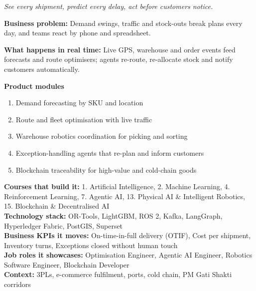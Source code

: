 \documentclass[10pt,a4paper]{article}
\begin{document}
\begin{tcolorbox}[enhanced,breakable,colback=white,colframe=navy,boxrule=0.6pt,arc=2pt,title={\color{goldl}PRODUCT 5 \;|\; LOGISTICS \& SUPPLY CHAIN\\\color{white}\large Autonomous Supply-Chain Control Tower},colbacktitle=navy,fonttitle=\small\bfseries]
{\small\itshape\color{muted}See every shipment, predict every delay, act before customers notice.}\par
\begin{tcolorbox}[colback=l1bg,colframe=l1bg,arc=2pt,borderline west={3pt}{0pt}{saffron},top=2pt,bottom=2pt]\small\textbf{Business problem:} Demand swings, traffic and stock-outs break plans every day, and teams react by phone and spreadsheet.\end{tcolorbox}
\begin{tcolorbox}[colback=l3bg,colframe=l3bg,arc=2pt,borderline west={3pt}{0pt}{igreen},top=2pt,bottom=2pt]\small\textbf{What happens in real time:} Live GPS, warehouse and order events feed forecasts and route optimisers; agents re-route, re-allocate stock and notify customers automatically.\end{tcolorbox}
{\small\textbf{Product modules}}\begin{enumerate}\small
\item Demand forecasting by SKU and location
\item Route and fleet optimisation with live traffic
\item Warehouse robotics coordination for picking and sorting
\item Exception-handling agents that re-plan and inform customers
\item Blockchain traceability for high-value and cold-chain goods
\end{enumerate}
{\small\textbf{Courses that build it:} 1. Artificial Intelligence, 2. Machine Learning, 4. Reinforcement Learning, 7. Agentic AI, 13. Physical AI \& Intelligent Robotics, 15. Blockchain \& Decentralised AI\\\textbf{Technology stack:} OR-Tools, LightGBM, ROS 2, Kafka, LangGraph, Hyperledger Fabric, PostGIS, Superset\\\textbf{Business KPIs it moves:} On-time-in-full delivery (OTIF), Cost per shipment, Inventory turns, Exceptions closed without human touch\\\textbf{Job roles it showcases:} Optimisation Engineer, Agentic AI Engineer, Robotics Software Engineer, Blockchain Developer\\\textbf{Context:} 3PLs, e-commerce fulfilment, ports, cold chain, PM Gati Shakti corridors}
\end{tcolorbox}
\end{document}
